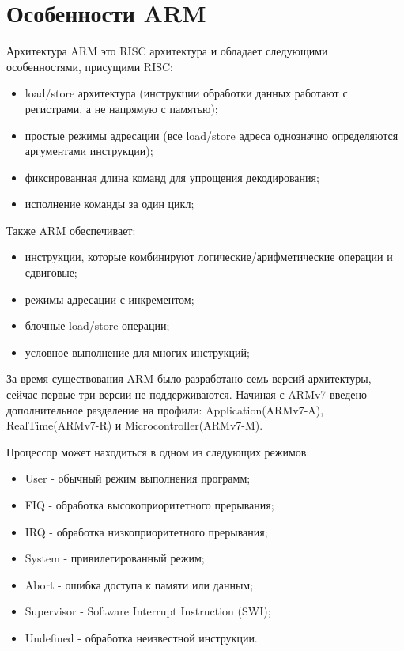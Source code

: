 \section{Особенности ARM}
Архитектура ARM это RISC архитектура и обладает следующими особенностями, присущими RISC\cite{bib:arm_arch_manual}:

\begin{itemize}
    \item load/store архитектура (инструкции обработки данных работают с регистрами, а не напрямую с памятью);
    \item простые режимы адресации (все load/store адреса однозначно определяются аргументами инструкции);
    \item фиксированная длина команд для упрощения декодирования;
    \item исполнение команды за один цикл;
\end{itemize}

Также ARM обеспечивает:

\begin{itemize}
    \item инструкции, которые комбинируют логические/арифметические операции и сдвиговые;
    \item режимы адресации с инкрементом;
    \item блочные load/store операции;
    \item условное выполнение для многих инструкций;
\end{itemize}

За время существования ARM было разработано семь версий архитектуры, сейчас первые три версии не поддерживаются. Начиная с ARMv7 введено дополнительное разделение на профили: Application(ARMv7-A), RealTime(ARMv7-R) и Microcontroller(ARMv7-M).

Процессор может находиться в одном из следующих режимов:
\begin{itemize}
    \item User - обычный режим выполнения программ;
    \item FIQ - обработка высокоприоритетного прерывания;
    \item IRQ - обработка низкоприоритетного прерывания;
    \item System - привилегированный режим;
    \item Abort - ошибка доступа к памяти или данным;
    \item Supervisor - Software Interrupt Instruction (SWI);
    \item Undefined - обработка неизвестной инструкции.
\end{itemize}

